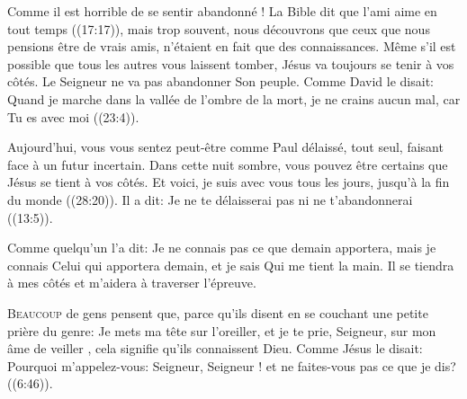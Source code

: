 Comme il est horrible de se sentir abandonné !
 La Bible dit que \Og l'ami 
 aime en tout temps \Fg{} ((17:17)), mais trop souvent,
 nous découvrons que ceux que nous pensions être de vrais amis,
 n'étaient en fait que des connaissances.
 Même s'il est possible que tous les autres vous laissent tomber,
 Jésus va toujours se tenir à vos côtés.
 Le Seigneur ne va pas abandonner Son peuple.
 Comme David le disait: 
 \Og Quand je marche dans la vallée de l'ombre de la mort,
 je ne crains aucun mal, car Tu es avec moi \Fg{} ((23:4)).


Aujourd'hui, vous vous sentez peut-être comme Paul \ocadr délaissé,
 tout seul, faisant face à un futur incertain.
 Dans cette nuit sombre, vous pouvez être certains que Jésus
 se tient à vos côtés.
 \Og Et voici, je suis avec vous tous les jours, jusqu'à la fin du monde \Fg{}
 ((28:20)).
 Il a dit: 
 \Og Je ne te délaisserai pas ni ne t'abandonnerai \Fg{}
 ((13:5)). 

Comme quelqu'un l'a dit: 
 \Og Je ne connais 
 pas ce que demain apportera, mais je connais Celui qui apportera demain,
 et je sais Qui me tient la main. \Fg{}
 Il se tiendra à mes côtés et m'aidera à traverser l'épreuve. 

\dvrule






\lettrine{B}{eaucoup} de gens pensent que,
 parce qu'ils disent en se couchant une petite prière
 du genre: 
 \Og Je mets ma tête sur l'oreiller, et je te prie, Seigneur,
 sur mon âme de veiller \Fg{}, cela signifie qu'ils connaissent Dieu.
 Comme Jésus le disait: 
 \Og Pourquoi m'appelez-vous: Seigneur, Seigneur !
 et ne faites-vous pas ce que je dis? \Fg{} ((6:46)).

